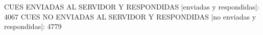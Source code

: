 CUES ENVIADAS AL SERVIDOR Y RESPONDIDAS
|enviadas y respondidas|: 4067
CUES NO ENVIADAS AL SERVIDOR Y RESPONDIDAS
|no enviadas y respondidas|: 4779
